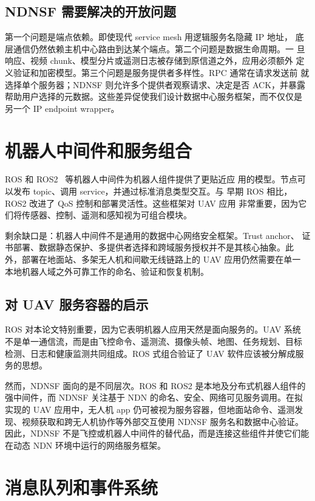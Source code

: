 \subsection{NDNSF 需要解决的开放问题}

第一个问题是端点依赖。即使现代 service mesh 用逻辑服务名隐藏 IP 地址，
底层通信仍然依赖主机中心路由到达某个端点。第二个问题是数据生命周期。一
旦响应、视频 chunk、模型分片或遥测日志被存储到原信道之外，应用必须额外
定义验证和加密模型。第三个问题是服务提供者多样性。RPC 通常在请求发送前
就选择单个服务器；NDNSF 则允许多个提供者观察请求、决定是否 ACK，并暴露
帮助用户选择的元数据。这些差异促使我们设计数据中心服务框架，而不仅仅是
另一个 IP endpoint wrapper。

\section{机器人中间件和服务组合}

ROS 和 ROS2~\cite{ros,ros2} 等机器人中间件为机器人组件提供了更贴近应
用的模型。节点可以发布 topic、调用 service，并通过标准消息类型交互。与
早期 ROS 相比，ROS2 改进了 QoS 控制和部署灵活性。这些框架对 UAV 应用
非常重要，因为它们将传感器、控制、遥测和感知视为可组合模块。

剩余缺口是：机器人中间件不是通用的数据中心网络安全框架。Trust anchor、
证书部署、数据静态保护、多提供者选择和跨域服务授权并不是其核心抽象。此
外，部署在地面站、多架无人机和间歇无线链路上的 UAV 应用仍然需要在单一
本地机器人域之外可靠工作的命名、验证和恢复机制。

\subsection{对 UAV 服务容器的启示}

ROS 对本论文特别重要，因为它表明机器人应用天然是面向服务的。UAV 系统
不是单一通信流，而是由飞控命令、遥测流、摄像头帧、地图、任务规划、目标
检测、日志和健康监测共同组成。ROS 式组合验证了 UAV 软件应该被分解成服
务的思想。

然而，NDNSF 面向的是不同层次。ROS 和 ROS2 是本地及分布式机器人组件的
强中间件，而 NDNSF 关注基于 NDN 的命名、安全、网络可见服务调用。在拟
实现的 UAV 应用中，无人机 app 仍可被视为服务容器，但地面站命令、遥测发
现、视频获取和跨无人机协作等外部交互使用 NDNSF 服务名和数据中心验证。
因此，NDNSF 不是飞控或机器人中间件的替代品，而是连接这些组件并使它们能
在动态 NDN 环境中运行的网络服务框架。

\section{消息队列和事件系统}

